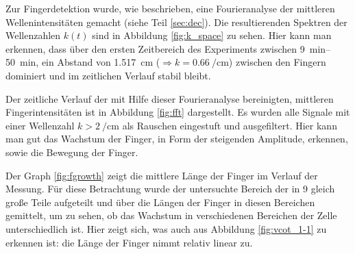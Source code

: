 
Zur Fingerdetektion wurde, wie beschrieben, eine Fourieranalyse der mittleren Wellenintensitäten gemacht (siehe Teil \ref{sec:dec}). Die resultierenden Spektren der Wellenzahlen $k(t)$ sind in Abbildung \ref{fig:k_space} zu sehen. Hier kann man erkennen, dass über den ersten Zeitbereich des Experiments zwischen \SIrange{9}{50}{\minute}, ein Abstand von \SI[round-precision=2]{1,517}{\centi\meter} ($\Rightarrow k=\SI[round-precision=2]{0,66}{\per\centi\meter}$) zwischen den Fingern dominiert und im zeitlichen Verlauf stabil bleibt. 

Der zeitliche Verlauf der mit Hilfe dieser Fourieranalyse bereinigten, mittleren Fingerintensitäten ist in Abbildung \ref{fig:fft} dargestellt. Es wurden alle Signale mit einer Wellenzahl $k > \SI{2}{\per\centi\meter}$ als Rauschen eingestuft und ausgefiltert. Hier kann man gut das Wachstum der Finger, in Form der steigenden Amplitude, erkennen, sowie die Bewegung der Finger. %



Der Graph \ref{fig:fgrowth} zeigt die mittlere Länge der Finger im Verlauf der Messung. Für diese Betrachtung wurde der untersuchte Bereich der \HSC in 9 gleich große Teile aufgeteilt und über die Längen der Finger in diesen Bereichen gemittelt, um zu sehen, ob das Wachstum in verschiedenen Bereichen der Zelle unterschiedlich ist.
Hier zeigt sich, was auch aus  Abbildung \ref{fig:vcot_1-1} zu erkennen ist: die Länge der Finger nimmt relativ linear zu.

